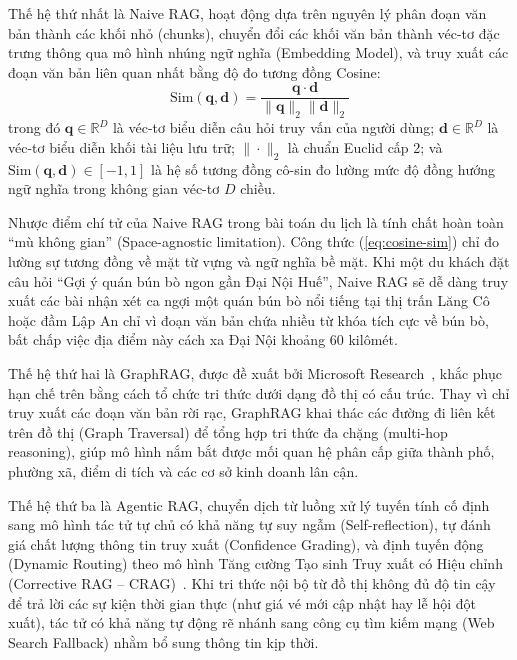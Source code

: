 Thế hệ thứ nhất là Naive RAG, hoạt động dựa trên nguyên lý phân đoạn văn bản thành các khối nhỏ (chunks), chuyển đổi các khối văn bản thành véc-tơ đặc trưng thông qua mô hình nhúng ngữ nghĩa (Embedding Model), và truy xuất các đoạn văn bản liên quan nhất bằng độ đo tương đồng Cosine:
\begin{equation}
    \text{Sim}(\mathbf{q}, \mathbf{d}) = \frac{\mathbf{q} \cdot \mathbf{d}}{\|\mathbf{q}\|_2 \|\mathbf{d}\|_2}
    \label{eq:cosine-sim}
\end{equation}
trong đó $\mathbf{q} \in \mathbb{R}^D$ là véc-tơ biểu diễn câu hỏi truy vấn của người dùng; $\mathbf{d} \in \mathbb{R}^D$ là véc-tơ biểu diễn khối tài liệu lưu trữ; $\|\cdot\|_2$ là chuẩn Euclid cấp 2; và $\text{Sim}(\mathbf{q}, \mathbf{d}) \in [-1, 1]$ là hệ số tương đồng cô-sin đo lường mức độ đồng hướng ngữ nghĩa trong không gian véc-tơ $D$ chiều.

Nhược điểm chí tử của Naive RAG trong bài toán du lịch là tính chất hoàn toàn ``mù không gian'' (Space-agnostic limitation). Công thức (\ref{eq:cosine-sim}) chỉ đo lường sự tương đồng về mặt từ vựng và ngữ nghĩa bề mặt. Khi một du khách đặt câu hỏi ``Gợi ý quán bún bò ngon gần Đại Nội Huế'', Naive RAG sẽ dễ dàng truy xuất các bài nhận xét ca ngợi một quán bún bò nổi tiếng tại thị trấn Lăng Cô hoặc đầm Lập An chỉ vì đoạn văn bản chứa nhiều từ khóa tích cực về bún bò, bất chấp việc địa điểm này cách xa Đại Nội khoảng 60 kilômét.

Thế hệ thứ hai là GraphRAG, được đề xuất bởi Microsoft Research~\cite{edge2024graphrag}, khắc phục hạn chế trên bằng cách tổ chức tri thức dưới dạng đồ thị có cấu trúc. Thay vì chỉ truy xuất các đoạn văn bản rời rạc, GraphRAG khai thác các đường đi liên kết trên đồ thị (Graph Traversal) để tổng hợp tri thức đa chặng (multi-hop reasoning), giúp mô hình nắm bắt được mối quan hệ phân cấp giữa thành phố, phường xã, điểm di tích và các cơ sở kinh doanh lân cận.

Thế hệ thứ ba là Agentic RAG, chuyển dịch từ luồng xử lý tuyến tính cố định sang mô hình tác tử tự chủ có khả năng tự suy ngẫm (Self-reflection), tự đánh giá chất lượng thông tin truy xuất (Confidence Grading), và định tuyến động (Dynamic Routing) theo mô hình Tăng cường Tạo sinh Truy xuất có Hiệu chỉnh (Corrective RAG -- CRAG)~\cite{yan2024crag}. Khi tri thức nội bộ từ đồ thị không đủ độ tin cậy để trả lời các sự kiện thời gian thực (như giá vé mới cập nhật hay lễ hội đột xuất), tác tử có khả năng tự động rẽ nhánh sang công cụ tìm kiếm mạng (Web Search Fallback) nhằm bổ sung thông tin kịp thời.

